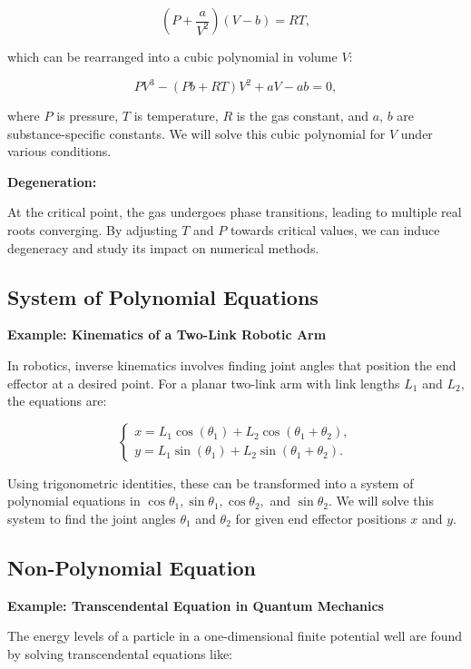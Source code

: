 \documentclass[12pt]{article}
\begin{document}
\[
\left( P + \frac{a}{V^2} \right)(V - b) = RT,
\]

which can be rearranged into a cubic polynomial in volume \( V \):

\[
P V^3 - (P b + R T)V^2 + a V - a b = 0,
\]

where \( P \) is pressure, \( T \) is temperature, \( R \) is the gas constant, and \( a \), \( b \) are substance-specific constants. We will solve this cubic polynomial for \( V \) under various conditions.

\textbf{Degeneration:}

At the critical point, the gas undergoes phase transitions, leading to multiple real roots converging. By adjusting \( T \) and \( P \) towards critical values, we can induce degeneracy and study its impact on numerical methods.

\subsection*{System of Polynomial Equations}

\textbf{Example: Kinematics of a Two-Link Robotic Arm}

In robotics, inverse kinematics involves finding joint angles that position the end effector at a desired point. For a planar two-link arm with link lengths \( L_1 \) and \( L_2 \), the equations are:

\[
\begin{cases}
x = L_1 \cos(\theta_1) + L_2 \cos(\theta_1 + \theta_2), \\
y = L_1 \sin(\theta_1) + L_2 \sin(\theta_1 + \theta_2).
\end{cases}
\]

Using trigonometric identities, these can be transformed into a system of polynomial equations in \( \cos \theta_1, \sin \theta_1, \cos \theta_2, \) and \( \sin \theta_2 \). We will solve this system to find the joint angles \( \theta_1 \) and \( \theta_2 \) for given end effector positions \( x \) and \( y \).

\subsection*{Non-Polynomial Equation}

\textbf{Example: Transcendental Equation in Quantum Mechanics}

The energy levels of a particle in a one-dimensional finite potential well are found by solving transcendental equations like:
\end{document}
